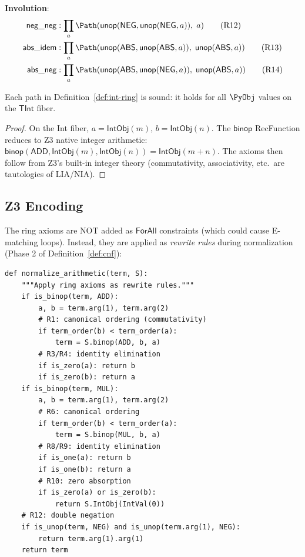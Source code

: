 \begin{definition}
\textbf{Involution}:
\begin{align}
  \mathsf{neg\_neg} &: \prod_a
    \Path(\mathsf{unop}(\mathsf{NEG}, \mathsf{unop}(\mathsf{NEG}, a)),\; a)
    \tag{R12} \\
  \mathsf{abs\_idem} &: \prod_a
    \Path(\mathsf{unop}(\mathsf{ABS}, \mathsf{unop}(\mathsf{ABS}, a)),\;
          \mathsf{unop}(\mathsf{ABS}, a))
    \tag{R13} \\
  \mathsf{abs\_neg} &: \prod_a
    \Path(\mathsf{unop}(\mathsf{ABS}, \mathsf{unop}(\mathsf{NEG}, a)),\;
          \mathsf{unop}(\mathsf{ABS}, a))
    \tag{R14}
\end{align}
\end{definition}

\begin{theorem}
Each path in Definition~\ref{def:int-ring} is sound: it holds for
all $\PyObj$ values on the $\mathsf{TInt}$ fiber.
\end{theorem}

\begin{proof}
On the Int fiber, $a = \mathsf{IntObj}(m)$, $b = \mathsf{IntObj}(n)$.
The $\mathsf{binop}$ RecFunction reduces to Z3 native integer
arithmetic: $\mathsf{binop}(\mathsf{ADD}, \mathsf{IntObj}(m),
\mathsf{IntObj}(n)) = \mathsf{IntObj}(m + n)$.  The axioms then
follow from Z3's built-in integer theory (commutativity, associativity,
etc.\ are tautologies of LIA/NIA).
\end{proof}

\subsection{Z3 Encoding}

The ring axioms are NOT added as $\mathsf{ForAll}$ constraints (which
could cause E-matching loops).  Instead, they are applied as
\emph{rewrite rules} during normalization (Phase 2 of
Definition~\ref{def:cnf}):

\begin{lstlisting}[caption={Ring axiom application during normalization}]
def normalize_arithmetic(term, S):
    """Apply ring axioms as rewrite rules."""
    if is_binop(term, ADD):
        a, b = term.arg(1), term.arg(2)
        # R1: canonical ordering (commutativity)
        if term_order(b) < term_order(a):
            term = S.binop(ADD, b, a)
        # R3/R4: identity elimination
        if is_zero(a): return b
        if is_zero(b): return a
    if is_binop(term, MUL):
        a, b = term.arg(1), term.arg(2)
        # R6: canonical ordering
        if term_order(b) < term_order(a):
            term = S.binop(MUL, b, a)
        # R8/R9: identity elimination
        if is_one(a): return b
        if is_one(b): return a
        # R10: zero absorption
        if is_zero(a) or is_zero(b):
            return S.IntObj(IntVal(0))
    # R12: double negation
    if is_unop(term, NEG) and is_unop(term.arg(1), NEG):
        return term.arg(1).arg(1)
    return term
\end{lstlisting}

